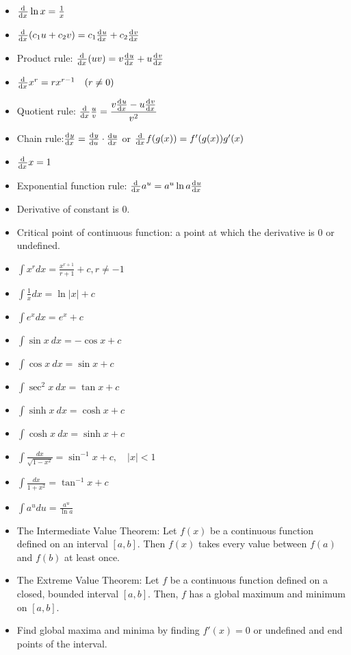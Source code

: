 \documentclass{article}
\begin{document}
\begin{multicols}{2}
\begin{itemize}[leftmargin=0.5cm]
    \item $\od{}{x}\ln x=\frac{1}{x}$
    \item $\od{}{x}(c_1u+c_2v)=c_1\od{u}{x}+c_2\od{v}{x}$
    \item Product rule: $\od{}{x}(uv)=v\od{u}{x}+u\od{v}{x}$
    \item $\od{}{x}x^r=rx^{r-1}\quad(r\neq0)$
    \item Quotient rule: $\od{}{x}\frac{u}{v}=\displaystyle\frac{v\od{u}{x}-u\od{v}{x}}{v^2}$
    \item Chain rule:$\od{y}{x}=\od{y}{u}\cdot\od{u}{x}$ or $\od{}{x}f(g(x))=f'(g(x))g'(x)$
    \item $\od{}{x}x=1$
    \item Exponential function rule: $\od{}{x}a^u=a^u\ln a\od{u}{x}$
    \item Derivative of constant is $0$.
    \item Critical point of continuous function: a point at which the derivative is 0 or undefined.
    \item $\displaystyle\int x^rdx=\frac{x^{r+1}}{r+1}+c, r\neq-1$
    \item $\displaystyle\int\frac{1}{x}dx=\ln|x|+c$
    \item $\displaystyle\int e^xdx=e^x+c$
    \item $\displaystyle\int\sin{x}\ dx=-\cos x+c$
    \item $\displaystyle\int\cos x\ dx=\sin x+c$
    \item $\displaystyle\int\sec^2x\ dx=\tan x+c$
    \item $\displaystyle\int\sinh x\ dx=\cosh x+c$
    \item $\displaystyle\int\cosh x\ dx=\sinh x+c$
    \item $\displaystyle\int\frac{dx}{\sqrt{1-x^2}}=\sin^{-1}x+c,\quad|x|<1$
    \item $\displaystyle\int\frac{dx}{1+x^2}=\tan^{-1}x+c$
    \item $\displaystyle\int{a^u}du=\frac{a^u}{\ln{a}}$
    \item The Intermediate Value Theorem: Let $f(x)$ be a continuous function defined on an interval $[a,b]$. Then $f(x)$ takes every value between $f(a)$ and $f(b)$ at least once.
    \item The Extreme Value Theorem: Let $f$ be a continuous function defined on a closed, bounded interval $[a,b]$. Then, $f$ has a global maximum and minimum on $[a,b]$.
    \item Find global maxima and minima by finding $f'(x)=0$ or undefined and end points of the interval.

\end{itemize}
\end{multicols}
\end{document}
